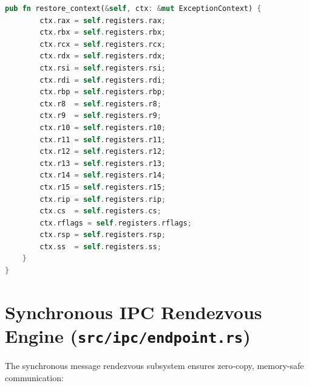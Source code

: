 \begin{lstlisting}[language=Rust, caption={Task Control Block and Context Definition (\texttt{src/task/tcb.rs})}]
    pub fn restore_context(&self, ctx: &mut ExceptionContext) {
        ctx.rax = self.registers.rax;
        ctx.rbx = self.registers.rbx;
        ctx.rcx = self.registers.rcx;
        ctx.rdx = self.registers.rdx;
        ctx.rsi = self.registers.rsi;
        ctx.rdi = self.registers.rdi;
        ctx.rbp = self.registers.rbp;
        ctx.r8  = self.registers.r8;
        ctx.r9  = self.registers.r9;
        ctx.r10 = self.registers.r10;
        ctx.r11 = self.registers.r11;
        ctx.r12 = self.registers.r12;
        ctx.r13 = self.registers.r13;
        ctx.r14 = self.registers.r14;
        ctx.r15 = self.registers.r15;
        ctx.rip = self.registers.rip;
        ctx.cs  = self.registers.cs;
        ctx.rflags = self.registers.rflags;
        ctx.rsp = self.registers.rsp;
        ctx.ss  = self.registers.ss;
    }
}
\end{lstlisting}

\section{Synchronous IPC Rendezvous Engine (\texttt{src/ipc/endpoint.rs})}
\label{sec:code_ipc}

The synchronous message rendezvous subsystem ensures zero-copy, memory-safe communication:

